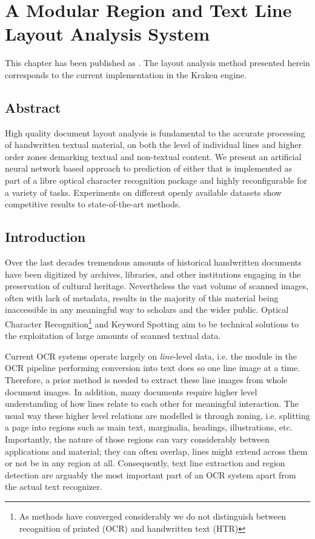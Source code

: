 \chapter{A Modular Region and Text Line Layout Analysis System}
\thispagestyle{empty}
\vfill
This chapter has been published as . The layout
analysis method presented herein corresponds to the current implementation in
the Kraken engine.
\label{ch:icfhr}
\newpage

\section*{Abstract}
High quality document layout analysis is fundamental to the accurate processing
of handwritten textual material, on both the level of individual lines and
higher order zones demarking textual and non-textual content. We present an
artificial neural network based approach to prediction of either that is
implemented as part of a libre optical character recognition package and highly
reconfigurable for a variety of tasks. Experiments on different openly
available datasets show competitive results to state-of-the-art methods.

\section{Introduction}

Over the last decades tremendous amounts of historical handwritten documents
have been digitized by archives, libraries, and other institutions engaging in
the preservation of cultural heritage. Nevertheless the vast volume of scanned
images, often with lack of metadata, results in the majority of this material
being inaccessible in any meaningful way to scholars and the wider public.
Optical Character Recognition\footnote{As methods have converged considerably
we do not distinguish between recognition of printed (OCR) and handwritten text
(HTR)} and Keyword Spotting aim to be technical solutions to the exploitation
of large amounts of scanned textual data. 

Current OCR systems operate largely on \emph{line}-level data, i.e. the module
in the OCR pipeline performing conversion into text does so one line image at a
time. Therefore, a prior method is needed to extract these line images from
whole document images. In addition, many documents require higher level
understanding of how lines relate to each other for meaningful interaction. The
usual way these higher level relations are modelled is through zoning, i.e.
splitting a page into regions such as main text, marginalia, headings,
illustrations, etc. Importantly, the nature of those regions can vary
considerably between applications and material; they can often overlap, lines
might extend across them or not be in any region at all. Consequently, text
line extraction and region detection are arguably the most important part of an
OCR system apart from the actual text recognizer.

